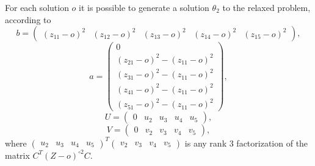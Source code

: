 \documentclass{article}
\begin{document}
For each solution $o$ it is possible to generate a solution $\theta_2$ to the relaxed problem, 
according to 
\begin{equation*}
\! b \! = \! \begin{pmatrix} (z_{11} \! - \! o)^2  \! \!  &  \! \!  (z_{12}-o)^2  \! \!  &  \! \!  (z_{13}-o)^2 \! \!  &  \! \!   (z_{14}-o)^2 \! \!  &  \! \!   (z_{15}-o)^2 \end{pmatrix} \! ,
\end{equation*}
\begin{equation}
a =  \begin{pmatrix} 0 \\ (z_{21}-o)^2 -(z_{11}-o)^2\\ (z_{31}-o)^2 -(z_{11}-o)^2 \\ (z_{41}-o)^2 -(z_{11}-o)^2 \\ (z_{51}-o)^2 -(z_{11}-o)^2 \end{pmatrix},
\end{equation}
\begin{equation}
U =  \begin{pmatrix} 0 & u_2 & u_3 & u_4 & u_5\end{pmatrix}, 
\end{equation}
\begin{equation}
V =  \begin{pmatrix}0 & v_2 & v_3 & v_4 & v_5\end{pmatrix} ,
\end{equation}
where $\begin{pmatrix}u_2 & u_3 & u_4 & u_5\end{pmatrix}^T  \begin{pmatrix} v_2 & v_3 & v_4 & v_5\end{pmatrix}$ is any rank $3$ factorization of the matrix $C^T (Z-o)^{\circ 2} C$. 
\end{document}
